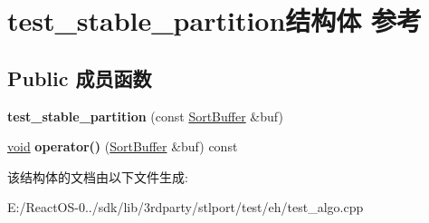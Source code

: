 \hypertarget{structtest__stable__partition}{}\section{test\+\_\+stable\+\_\+partition结构体 参考}
\label{structtest__stable__partition}
\subsection*{Public 成员函数}
\begin{DoxyCompactItemize}
\item 
\mbox{\label{structtest__stable__partition_abe6667f9c8341b03a94cd8653b7795c8}} 
{\bfseries test\+\_\+stable\+\_\+partition} (const \hyperlink{struct_sort_buffer}{Sort\+Buffer} \&buf)
\item 
\mbox{\label{structtest__stable__partition_a7e4936c6dce67f04dd740ec2d8d3af3d}} 
\hyperlink{interfacevoid}{void} {\bfseries operator()} (\hyperlink{struct_sort_buffer}{Sort\+Buffer} \&buf) const
\end{DoxyCompactItemize}


该结构体的文档由以下文件生成\+:\begin{DoxyCompactItemize}
\item 
E\+:/\+React\+O\+S-\/0../sdk/lib/3rdparty/stlport/test/eh/test\+\_\+algo.\+cpp\end{DoxyCompactItemize}
